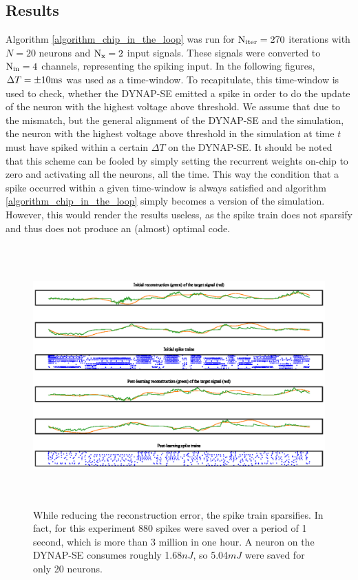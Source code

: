 \documentclass[twoside,11pt]{article}
\begin{document}
\subsection{Results}

Algorithm \ref{algorithm_chip_in_the_loop} was run for $\textnormal{N}_{\textnormal{iter}} = 270$ iterations
with $N = 20$ neurons and $\textnormal{N}_\textnormal{x} = 2$ input signals.
These signals were converted to $\textnormal{N}_{\textnormal{in}} = 4$ channels, representing the
spiking input. In the following figures, $\Delta T = \pm 10 \textnormal{ms}$ was used as a time-window.
To recapitulate, this time-window is used to check, whether the DYNAP-SE emitted a spike in order
to do the update of the neuron with the highest voltage above threshold. We assume that due to
the mismatch, but the general alignment of the DYNAP-SE and the simulation, the neuron with
the highest voltage above threshold in the simulation at time $t$ must have
spiked within a certain $\Delta T$ on the DYNAP-SE.
It should be noted that this scheme can be fooled by simply setting the recurrent weights on-chip
to zero and activating all the neurons, all the time. This way the condition that a spike occurred
within a given time-window is always satisfied and algorithm \ref{algorithm_chip_in_the_loop}
simply becomes a version of the simulation. However, this would render the results useless, as
the spike train does not sparsify and thus does not produce an (almost) optimal code. \\


\begin{figure}[!htb]
  \centering
  \includegraphics[width = \columnwidth, height=10cm]{figures/DYNAPS_reconstruction.eps}
  \caption{While reducing the reconstruction error, the spike train sparsifies.
  In fact, for this experiment 880 spikes were saved over a period of 1 second, which is more
  than 3 million in one hour. A neuron on the DYNAP-SE consumes roughly 1.68$nJ$, so
  5.04$mJ$ were saved for only 20 neurons.}
  \label{fig:DYNAPS_reconstruction}
\end{figure}
\end{document}

